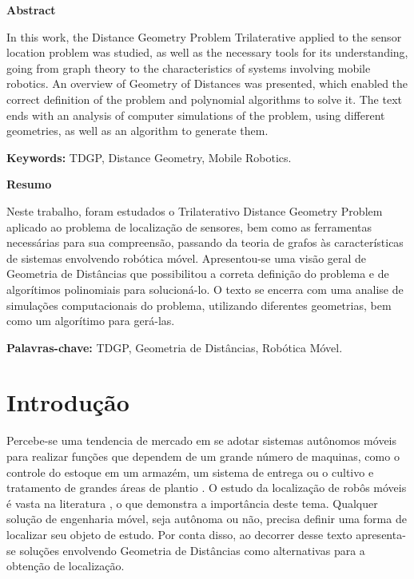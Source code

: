 \documentclass[a4paper,12pt]{article}
\begin{document}
	\begin{center}
		\large
		\textbf{Abstract}
	\end{center}
	
	
	In this work, the Distance Geometry Problem Trilaterative applied to the sensor location problem was studied, as well as the necessary tools for its understanding, going from graph theory to the characteristics of systems involving mobile robotics. An overview of Geometry of Distances was presented, which enabled the correct definition of the problem and polynomial algorithms to solve it. The text ends with an analysis of computer simulations of the problem, using different geometries, as well as an algorithm to generate them.
	
	\textbf{Keywords:} TDGP, Distance Geometry, Mobile Robotics.
	
	
	\vspace{2cm}	
	\begin{center}
		\large
		\textbf{Resumo}
	\end{center}
	
	Neste trabalho, foram estudados o Trilaterativo Distance Geometry Problem aplicado ao problema de localização de sensores, bem como as ferramentas necessárias para sua compreensão, passando da teoria de grafos às características de sistemas envolvendo robótica móvel. Apresentou-se uma visão geral de Geometria de Distâncias que possibilitou a correta definição do problema e de algorítimos polinomiais para solucioná-lo. O texto se encerra com uma analise de simulações computacionais do problema, utilizando diferentes geometrias, bem como um algorítimo para gerá-las. 
	
	\textbf{Palavras-chave:} TDGP, Geometria de Distâncias, Robótica Móvel.
	
	
	\newpage
	\section{Introdução}
	
	Percebe-se uma tendencia de mercado em se adotar sistemas autônomos móveis para realizar funções que dependem de um grande número de maquinas, como o controle do estoque em um armazém, um sistema de entrega ou o cultivo e tratamento de grandes áreas de plantio \cite{mobileRobotsCook}. O estudo da localização de robôs móveis é vasta na literatura \cite{eren2004rigidity, mobileRobotsTzafestas}, o que demonstra a importância deste tema. Qualquer solução de engenharia móvel, seja autônoma ou não, precisa definir uma forma de localizar seu objeto de estudo. Por conta disso, ao decorrer desse texto apresenta-se soluções envolvendo Geometria de Distâncias como alternativas para a obtenção de localização.
	\\
	
\end{document}
